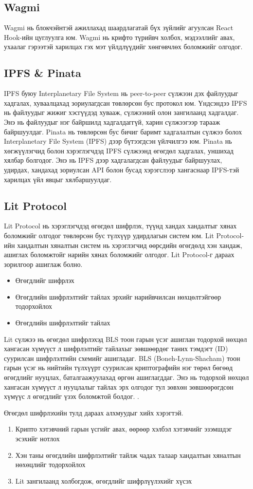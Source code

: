 \subsection{Wagmi}
Wagmi нь блокчэйнтэй ажиллахад шаардлагатай бүх зүйлийг агуулсан React Hook-ийн цуглуулга юм. Wagmi нь крифто түрийвч холбох, мэдээллийг авах, ухаалаг гэрээтэй харилцах гэх мэт үйлдлүүдийг хөнгөвчлөх боломжийг олгодог.

\subsection{IPFS \& Pinata}
IPFS буюу Interplanetary File System нь peer-to-peer сүлжээн дэх файлуудыг хадгалах, хуваалцахад зориулагдсан төвлөрсөн бус протокол юм. Үндсэндээ IPFS нь файлуудыг жижиг хэсгүүдэд хувааж, сүлжээний олон зангилаанд хадгалдаг. Энэ нь файлуудыг нэг байршилд хадгалдаггүй, харин сүлжээгээр тарааж байршуулдаг.
Pinata нь төвлөрсөн бус бичиг баримт хадгалалтын сүлжээ болох Interplanetary File System (IPFS) дээр бүтээгдсэн үйлчилгээ юм. Pinata нь хөгжүүлэгчид болон хэрэглэгчдэд IPFS сүлжээнд өгөгдөл хадгалах, уншихад хялбар болгодог. Энэ нь IPFS дээр хадгалагдсан файлуудыг байршуулах, удирдах, хандахад зориулсан API болон бусад хэрэгслээр хангаснаар IPFS-тэй харилцах үйл явцыг хялбаршуулдаг.

\subsection{Lit Protocol}
Lit Protocol нь хэрэглэгчдэд өгөгдөл шифрлэх, түүнд хандах хандалтыг хянах боломжийг олгодог төвлөрсөн бус түлхүүр удирдлагын систем юм. Lit Protocol-ийн хандалтын хяналтын систем нь хэрэглэгчид өөрсдийн өгөгдөлд хэн хандаж, ашиглах боломжтойг нарийн хянах боломжийг олгодог.
Lit Protocol-г дараах зорилгоор ашиглаж болно.
\begin{itemize}
   \item Өгөгдлийг шифрлэх
   \item Өгөгдлийн шифрлэлтийг тайлах эрхийг нарийвчилсан нөхцөлтэйгөөр тодорхойлох
   \item Өгөгдлийн шифрлэлтийг тайлах
\end{itemize}

Lit сүлжээ нь өгөгдөл шифрлэхэд BLS тоон гарын үсэг ашиглан тодорхой нөхцөл хангасан хүмүүст л шифрлэлтийг тайлахыг зөвшөөрдөг таних тэмдэгт (ID) суурилсан шифрлэлтийн схемийг ашигладаг.
BLS (Boneh-Lynn-Shacham) тоон гарын үсэг нь нийтийн түлхүүрт суурилсан криптографийн нэг төрөл бөгөөд өгөгдлийг нууцлах, баталгаажуулахад өргөн ашиглагддаг. Энэ нь тодорхой нөхцөл хангасан хүмүүст л нууцлалыг тайлах эрх олгодог тул зөвхөн зөвшөөрөгдсөн хүмүүс л өгөгдлийг үзэх боломжтой болдог. .

Өгөгдөл шифрлэхийн тулд дараах алхмуудыг хийх хэрэгтэй.
\begin{enumerate}
   \item Крипто хэтэвчний гарын үсгийг авах, өөрөөр хэлбэл хэтэвчийг эзэмшдэг эсэхийг нотлох
   \item Хэн таны өгөгдлийн шифрлэлтийг тайлж чадах талаар хандалтын хяналтын нөхөцлийг тодорхойлох
   \item Lit зангилаанд холбогдож, өгөгдлийг шифрлүүлэхийг хүсэх
\end{enumerate}